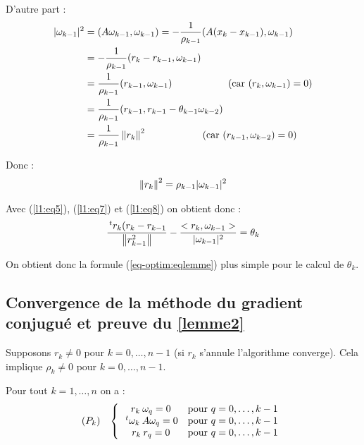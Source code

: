 D'autre part :
\begin{align*}
    |\omega_{k-1}|^2 & = (A \omega_{k-1}, \omega_{k-1}) = -\frac{1}{\rho_{k-1}}(A (x_k - x_{k-1}), \omega_{k-1}) \\
    & = -\frac{1}{\rho_{k-1}}(r_k - r_{k-1} , \omega_{k-1}) \\
    & = \frac{1}{\rho_{k-1}}(r_{k-1}, \omega_{k-1}) \hspace{2cm} \text{(car $(r_k,\omega_{k-1}) = 0$)}\\
    & = \frac{1}{\rho_{k-1}}(r_{k-1},r_{k-1}- \theta_{k-1}\omega_{k-2}) \\
    & = \frac{1}{\rho_{k-1}}\left\lVert r_k\right\rVert^2 \hspace{2cm} \text{(car $(r_{k-1}, \omega_{k-2}) = 0$)}
\end{align*}

Donc :
\begin{align}
    \left\lVert r_k\right\rVert^2 = \rho_{k-1} |\omega_{k-1}|^2
    \label{l1:eq8}
\end{align}

Avec (\ref{l1:eq5}), (\ref{l1:eq7}) et (\ref{l1:eq8}) on obtient donc :
\[
    \frac{\,^tr_k (r_k - r_{k-1}}{\left\lVert r_{k-1}^2\right\rVert}  - \frac{<r_k,\omega_{k-1}>}{|\omega_{k-1}|^2} = \theta_k
\]

On obtient donc la formule (\ref{eq-optim:eqlemme}) plus simple pour le calcul de $\theta_k$.

\subsection{Convergence de la méthode du gradient conjugué et preuve du \ref{lemme2}}

Supposons $r_k \ne 0$ pour $k = 0,\dots,n-1$ (si $r_k$ s'annule l'algorithme converge). Cela implique
$\rho_k \ne 0$ pour $k=0,\dots,n-1$.

\begin{lemme}
    Pour tout $k=1,\dots,n$ on a :
    \[
        \begin{array}{cc}
            (P_k) &
            \left\lbrace
            \begin{array}{cc}
                r_k \: \omega_q = 0 & \text{pour $q = 0,\dots,k-1$} \\
                \,^t\omega_k \: A \omega_q = 0 & \text{pour $q = 0,\dots,k-1$} \\
                r_k \: r_q = 0 & \text{pour $q = 0,\dots,k-1$} \\
            \end{array}
            \right.
        \end{array}
    \]
    \label{lemme3}
\end{lemme}

